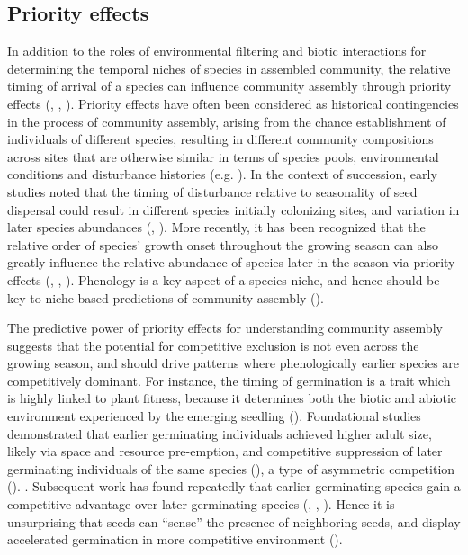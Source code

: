 \documentclass[11pt]{article}
\begin{document}
\subsection*{Priority effects}

In addition to the roles of environmental filtering and biotic interactions for determining the temporal niches of species in assembled community, the relative timing of arrival of a species can influence community assembly through priority effects (\citet{alford1985priority}, \citet{chase2003community}, \citet{fukami2015historical}). Priority effects have often been considered as historical contingencies in the process of community assembly, arising from the chance establishment of individuals of different species, resulting in different community compositions across sites that are otherwise similar in terms of species pools, environmental conditions and disturbance histories (e.g. \citet{diamond1975assembly}). In the context of succession, early studies noted that the timing of disturbance relative to seasonality of seed dispersal could result in different species initially colonizing sites, and variation in later species abundances (\citet{keever1950causes}, \citet{holt1972effect}). More recently, it has been recognized that the relative order of species’ growth onset throughout the growing season can also greatly influence the relative abundance of species later in the season via priority effects (\citet{fukami2015historical}, \citet{wainwright2012seasonal}, \citet{rudolf2019role}).  Phenology is a key aspect of a species niche, and hence should be key to niche-based predictions of community assembly (\citet{vannette2014historical}).

The predictive power of priority effects for understanding community assembly suggests that the potential for competitive exclusion is not even across the growing season, and should drive patterns where phenologically earlier species are competitively dominant. For instance, the timing of germination is a trait which is highly linked to plant fitness, because it determines both the biotic and abiotic environment experienced by the emerging seedling (\citet{donohue2010germination}). Foundational studies demonstrated that earlier germinating individuals achieved higher adult size, likely via space and resource pre-emption, and competitive suppression of later germinating individuals of the same species (\citet{ross1972occupation}),  a type of asymmetric competition (\citet{connolly1996asymmetric}). . Subsequent work has found repeatedly that earlier germinating species gain a competitive advantage over later germinating species (\cite{cleland2015priority}, \citet{waterton2016trade}, \citet{blackford2020species}). Hence it is unsurprising that seeds can “sense” the presence of neighboring seeds, and display accelerated germination in more competitive environment (\citet{dyer2000accelerated}).
\end{document}
